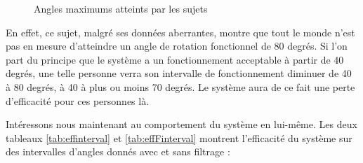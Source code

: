 \documentclass[letterpaper, twoside, 12pt, memoire, creativecommons, hyperref]{thETS}
\begin{document}
\begin{figure}
	\centering
	\caption{Angles maximums atteints par les sujets}
	\label{fig:anglesmax}
\end{figure}

En effet, ce sujet, malgré ses données aberrantes, montre que tout le monde n'est pas en mesure d'atteindre un angle de rotation fonctionnel de 80 degrés. Si l'on part du principe que le système a un fonctionnement acceptable à partir de 40 degrés, une telle personne verra son intervalle de fonctionnement diminuer de 40 à 80 degrés, à 40 à plus ou moins 70 degrés. Le système aura de ce fait une perte d'efficacité pour ces personnes là. 

Intéressons nous maintenant au comportement du système en lui-même. Les deux tableaux \ref{tab:effinterval} et \ref{tab:effFinterval} montrent l'efficacité du système sur des intervalles d'angles donnés avec et sans filtrage : 
\end{document}
